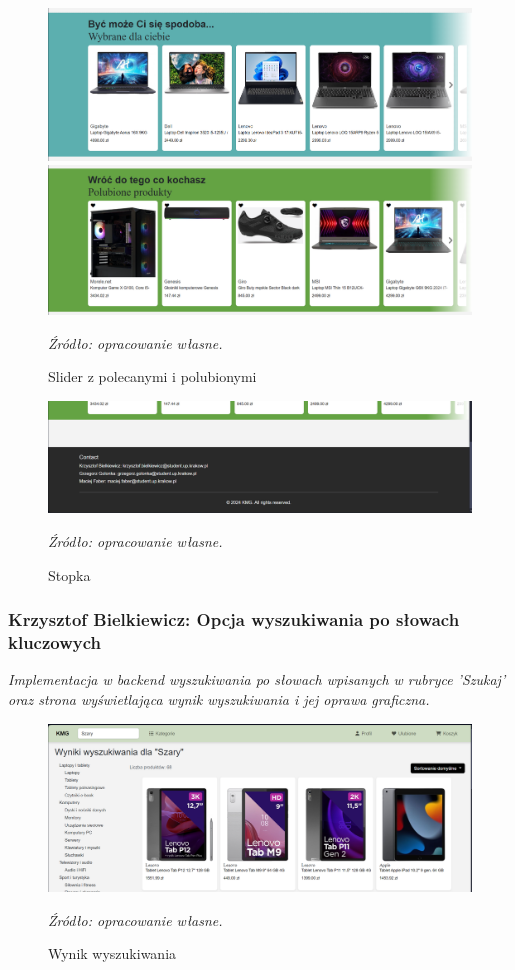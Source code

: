 \documentclass[12pt,a4paper,oneside]{article}
\theoremstyle{definition}
\numberwithin{equation}{section}
\begin{document}
    \begin{figure}[H]
        \centering
        \includegraphics[width=0.7\columnwidth]{images/krzysztofBImages/slider-polecane.png}
        \includegraphics[width=0.7\columnwidth]{images/krzysztofBImages/slider-ulubione.png}
        \caption{Slider z polecanymi i polubionymi}
        \emph{Źródło: opracowanie własne.}
    \end{figure}

    \begin{figure}[H]
        \centering
        \includegraphics[width=0.7\columnwidth]{images/krzysztofBImages/footer.png}
        \caption{Stopka}
        \emph{Źródło: opracowanie własne.}
    \end{figure}


\subsubsection{Krzysztof Bielkiewicz: Opcja wyszukiwania po słowach kluczowych}
\label{1.3.3}
\textit{Implementacja w backend wyszukiwania po słowach wpisanych w rubryce 'Szukaj'
oraz strona wyświetlająca wynik wyszukiwania i jej oprawa graficzna.}
\begin{figure}[H]
    \centering
    \includegraphics[width=0.8\columnwidth]{images/krzysztofBImages/wyszukiwanie.png}
    \caption{Wynik wyszukiwania}
    \emph{Źródło: opracowanie własne.}
\end{figure}
\end{document}
